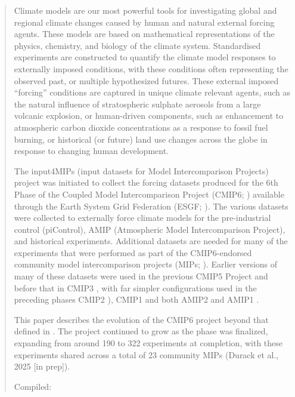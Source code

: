 \documentclass[gmd, preprint]{copernicus}
\begin{document}
\begin{abstract}
Climate models are our most powerful tools for investigating global and regional climate changes caused by human and natural external forcing agents. These models are based on mathematical representations of the physics, chemistry, and biology of the climate system. Standardised experiments are constructed to quantify the climate model responses to externally imposed conditions, with these conditions often representing the observed past, or multiple hypothesized futures. These external imposed “forcing” conditions are captured in unique climate relevant agents, such as the natural influence of stratospheric sulphate aerosols from a large volcanic explosion, or human-driven components, such as enhancement to atmospheric carbon dioxide concentrations as a response to fossil fuel burning, or historical (or future) land use changes across the globe in response to changing human development.

The input4MIPs (input datasets for Model Intercomparison Projects) project was initiated to collect the forcing datasets produced for the 6th Phase of the Coupled Model Intercomparison Project (CMIP6; \citet{eyring_overview_2016}) available through the Earth System Grid Federation (ESGF; \citet{williams_global_2016}). The various datasets were collected to externally force climate models for the pre-industrial control (piControl), AMIP (Atmospheric Model Intercomparison Project), and historical experiments. Additional datasets are needed for many of the experiments that were performed as part of the CMIP6-endorsed community model intercomparison projects (MIPs; \citet{eyring_overview_2016}). Earlier versions of many of these datasets were used in the previous CMIP5 Project \citep{taylor_overview_2012} and before that in CMIP3 \citep{meehl_global_2007}, with far simpler configurations used in the preceding phases CMIP2 \citep{meehl_global_1995}), CMIP1 \citep{meehl_intercomparison_1997} and both AMIP2 and AMIP1 \citep{gleckler_amip_1999,gates_amip_1991}.

This paper describes the evolution of the CMIP6 project beyond that defined in \citet{eyring_overview_2016}. The project continued to grow as the phase was finalized, expanding from around 190 to 322 experiments at completion, with these experiments shared across a total of 23 community MIPs (Durack et al., 2025 [in prep]). 

{Compiled: \DTMnow}

\end{abstract}
\end{document}
